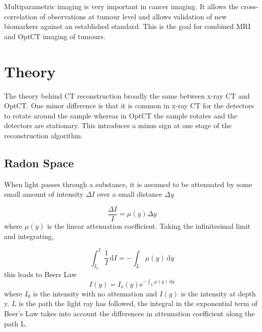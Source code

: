 \documentclass[12pt]{article}
\begin{document}

Multiparametric imaging is very important in cancer imaging. It allows the cross-correlation of observations at tumour level and allows validation of new biomarkers against an established standard. \cite{Padhani:2010hfa} This is the goal for combined MRI and OptCT imaging of tumours. 


\section{Theory}
\label{sec:theory}

The theory behind CT reconstruction broadly the same between x-ray CT and OptCT. One minor difference is that it is common in x-ray CT for the detectors to rotate around the sample whereas in OptCT the sample rotates and the detectors are stationary. This introduces a minus sign at one stage of the reconstruction algorithm.



\subsection{Radon Space}

When light passes through a substance, it is assumed to be attenuated by some small amount of intensity $\Delta I$ over a small distance $\Delta y$ 

\begin{equation}
\dfrac{\Delta I}{I} = \mu(y)\Delta y
\end{equation}
where $\mu(y)$ is the linear attenuation coefficient.
Taking the infinitesimal limit and integrating, 

\begin{equation}
\int_{I_0}^{I} \frac{1}{I}\, \mathrm{d}I = - \int_L \mu(y)\, \mathrm{d}y
\end{equation}
this leads to Beers Law 
\begin{equation}
I(y) = I_{o}(y)\mathrm{e}^{-\int_L \mu(y)\, \mathrm{d}y}
\label{eq:Beer}
\end{equation}
where $I_0$ is the intensity with no attenuation and $I(y)$ is the intensity at depth y. $L$ is the path the light ray has followed, the integral in the exponential term of Beer's Law takes into account the differences in attenuation coefficient along the path L. 
\end{document}
